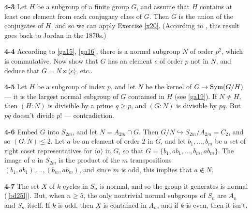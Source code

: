 \documentclass[a4paper,11pt,final]{memoir}%
\theoremstyle{nonumberplain}
\begin{document}
\bigskip\noindent\textbf{4-3}
Let $H$ be a subgroup of a finite group $G$, and assume that $H$ contains at
least one element from each conjugacy class of $G$. Then $G$ is the union of
the conjugates of $H$, and so we can apply Exercise \ref{x20}.
(According to \cite{serre2003}, this result goes back to Jordan in the 1870s.)

\bigskip\noindent\textbf{4-4}
According to \ref{ga15}, \ref{ga16}, there is a normal subgroup $N$ of order
$p^{2}$, which is commutative. Now show that $G$ has an element $c$ of order
$p$ not in $N$, and deduce that $G=N\rtimes\langle c\rangle$, etc..

\bigskip\noindent\textbf{4-5}
Let $H$ be a subgroup of index $p$, and let $N$ be the kernel of
$G\rightarrow\operatorname{Sym}(G/H)$ --- it is the largest normal subgroup of $G$ contained
in $H$ (see \ref{ga19}). If $N\neq H$, then $(H:N)$ is divisible by a prime
$q\geq p$, and $(G:N)$ is divisible by $pq$. But $pq$ doesn't divide $p!$ --- contradiction.

\bigskip\noindent\textbf{4-6}
Embed $G$ into $S_{2m}$, and let $N=A_{2m}\cap G$. Then $G/N\hookrightarrow
S_{2m}/A_{2m}=C_{2}$, and so $(G:N)\leq2$. Let $a$ be an element of order $2$
in $G$, and let $b_{1},\ldots,b_{m}$ be a set of right coset representatives
for $\langle a\rangle$ in $G$, so that $G=\{b_{1},ab_{1},\ldots,b_{m}%
,ab_{m}\}$. The image of $a$ in $S_{2m}$ is the product of the $m$
transpositions $(b_{1},ab_{1}),\ldots,(b_{m},ab_{m})$, and since $m$ is odd,
this implies that $a\notin N$.

\bigskip\noindent\textbf{4-7}
The set $X$ of $k$-cycles in $S_{n}$ is normal, and so the group it generates
is normal (\ref{bd25l}). But, when $n\geq5$, the only nontrivial normal
subgroups of $S_{n}$ are $A_{n}$ and $S_{n}$ itself. If $k$ is odd, then $X$
is contained in $A_{n}$, and if $k$ is even, then it isn't.
\end{document}
